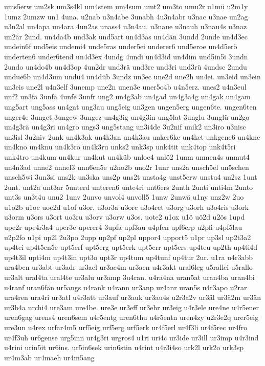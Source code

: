 {ums5erw
um2sk
um3s4kl
um4stem
um4sum
umt2
um3to
umu2r
u1mü
u2m1y
1umz
2umzw
un1
4una.
u2nab
u3n4abe
3unabh
4u3n4abr
u3nac
u3nae
un2ag
u3n2al
un4apa
un4ara
4un2as
unass4
u3n4au.
u3naue
u3nauh
u3nau4s
u3naz
un2är
2und.
un4da4b
und3ak
und5art
un4d3as
un4dän
3undd
2unde
un4d3ec
undein6f
und5eis
undemi4
unde5ras
under5ei
underer6
und5eroe
un4d5erö
underten6
under6tend
un4d3ex
4undg
4undi
un4d3id
un4dim
und5in5i
3undn
2undo
un4do4b
un4d3op
4un2dr
und3rä
und3re
und3ri
und3rü
4undsc
2undu
undue6b
un4d3um
undü4
un4düb
3undz
un3ec
une2d
une2h
un4ei.
un3eid
un3ein
un3eis
une2l
u4n3elf
3unemp
une2n
unen3e
uner5o4b
u4n5erz.
unes2
u4n3eul
unf2
un3fa
3unfä
4unfe
3unfr
ung2
un4g3ab
un4gad
un4g3a4g
un4gak
un4gam
ung5art
ung5ass
un4gat
ung3au
ung5eig
un3gen
ungen5erg
ungen6te.
ungen6ten
unger4e
3unget
3ungew
3ungez
un4g3ig
un4g3in
ung5lat
3unglu
3unglü
un2go
un4g3rä
un4g3ri
un4gro
ungs3
ung5stang
un3i4de
3u2nif
unik2
un3iro
u3nisc
un3isl
3u2niv
2unk
un4k3ak
un4k3an
un4k3au
unker6ke
un4ket
unkgene6
un4kne
un4kno
un4knu
un4k3ro
un4k3ru
unks2
unk3sp
unk4tit
unk4top
unk4t5ri
unk4tro
un4kum
un4kur
un4kut
un4küb
unloe4
unlö2
1unm
unmen4s
unmut4
un4n3ad
unne2
unnel3
unn6en5e
u2no2b
uno2r
1unr
uns2a
unsch5el
un5schen
unsch5wi
3un3si
uns2k
un3ska
uns2p
uns2t
unsta4g
unst5erw
unstu4
un2sz
1unt
2unt.
unt2a
unt3ar
5unterd
unteren6
unte4ri
unt6ers
2unth
2unti
unti4m
2unto
unt3s
un3t4u
unu2
1unv
2unvo
unvol4
unvoll5
1unw
2unwä
u1ny
unz2w
2uo
u1o2b
u1oc
uoe2d
u1of
u3or.
u3or3a
u3orc
u3o4ret
u3org
u3orh
u3o4ris
u3ork
u3orm
u3ors
u3ort
uo3ru
u3orv
u3orw
u3os.
uote2
u1ox
u1ö
uö2d
u2ös
1upd
upe2r
upe4r3a4
uper3e
uperer4
3upfa
upf3au
u4pfen
upf6erp
u2pfi
u4pf5lau
u2p2fo
u1pi
up2l
2u3po
2upp
up2pf
up2pl
uppor4
upport5
u1pr
up3sl
up2t3a2
up4tei
up4t5en5e
upt5erf
upt5erg
upt5erk
upt5err
upt5ers
up4teu
up2th
up4ti4d
up4t3il
upti4m
up4t3in
upt3o
upt3r
up4tum
up4tunf
up4tur
2ur.
u1ra
u4r3abb
ura4ben
ur3abt
ur3adr
ur3ael
ur3ae4m
ur3aen
u4r3akt
ural6leg
u5rallei
u5rallo
ur3alt
ural4ta
ural4te
ur3alu
ur3amp
3u4ran.
u4ra4na
uran5at
uran4ba
uran4bi
u4ranf
uran6fän
ur5angs
u4rank
u4rann
ur3anp
ur4anr
uran5s
u4r3apo
u2rar
ura4ren
ura4ri
ur3atl
u4r3att
ur3auf
ur3auk
ur3au4s
u2r3a2v
ur3äl
ur3ä2m
ur3än
ur3b4a
urchi4
ure3am
ure4be.
ure3e
ur3eff
ur3ehr
ur3eig
u4r3ele
ure4ne
u4r5ener
uren6gag
urens4
uren6sem
u4r5entg
uren6thu
u4r5entn
uren4zy
u2r3e2q
urer5eig
ure3un
u4rex
urfar4m5
urf5eig
urf5erg
urf5erk
ur4f5erl
ur4f3li
ur4f5rec
ur4fro
ur4f3uh
ur6gense
urg5inn
ur4g3ri
urgros4
u1ri
uri4c
ur3ide
ur3ill
ur3imp
u4r3ind
u4rini
urin5it
ur6ins.
ur5in6sek
urin6stin
u4rint
u4r3i4so
urk2l
urk2o
urk3sp
ur4m3ab
ur4maeh
ur4m5ang
}
